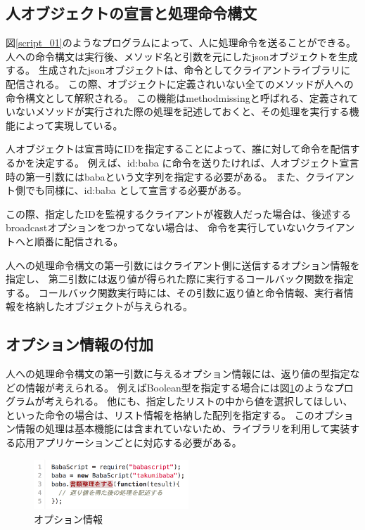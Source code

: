 \subsection{人オブジェクトの宣言と処理命令構文}\label{ux4ebaux30aaux30d6ux30b8ux30a7ux30afux30c8ux306eux5ba3ux8a00ux3068ux51e6ux7406ux547dux4ee4ux69cbux6587}

図\ref{script_01}のようなプログラムによって、人に処理命令を送ることができる。
人への命令構文は実行後、メソッド名と引数を元にしたjsonオブジェクトを生成する。
生成されたjsonオブジェクトは、命令としてクライアントライブラリに配信される。
この際、オブジェクトに定義されいない全てのメソッドが人への命令構文として解釈される。
この機能はmethodmissingと呼ばれる、定義されていないメソッドが実行された際の処理を記述しておくと、その処理を実行する機能によって実現している。

人オブジェクトは宣言時にIDを指定することによって、誰に対して命令を配信するかを決定する。
例えば、id:baba
に命令を送りたければ、人オブジェクト宣言時の第一引数にはbabaという文字列を指定する必要がある。
また、クライアント側でも同様に、id:baba として宣言する必要がある。

この際、指定したIDを監視するクライアントが複数人だった場合は、後述するbroadcastオプションをつかってない場合は、
命令を実行していないクライアントへと順番に配信される。

人への処理命令構文の第一引数にはクライアント側に送信するオプション情報を指定し、
第二引数には返り値が得られた際に実行するコールバック関数を指定する。
コールバック関数実行時には、その引数に返り値と命令情報、実行者情報を格納したオブジェクトが与えられる。

\subsection{オプション情報の付加}\label{ux30aaux30d7ux30b7ux30e7ux30f3ux60c5ux5831ux306eux4ed8ux52a0}

人への処理命令構文の第一引数に与えるオプション情報には、返り値の型指定などの情報が考えられる。
例えばBoolean型を指定する場合には図\ref{script_02}のようなプログラムが考えられる。
他にも、指定したリストの中から値を選択してほしい、といった命令の場合は、リスト情報を格納した配列を指定する。
このオプション情報の処理は基本機能には含まれていないため、ライブラリを利用して実装する応用アプリケーションごとに対応する必要がある。

\begin{figure}[h]
  \centering  
  \includegraphics[width=220px]{./images/script_02.png}
  \caption{オプション情報}
  \label{script_02}
\end{figure}

